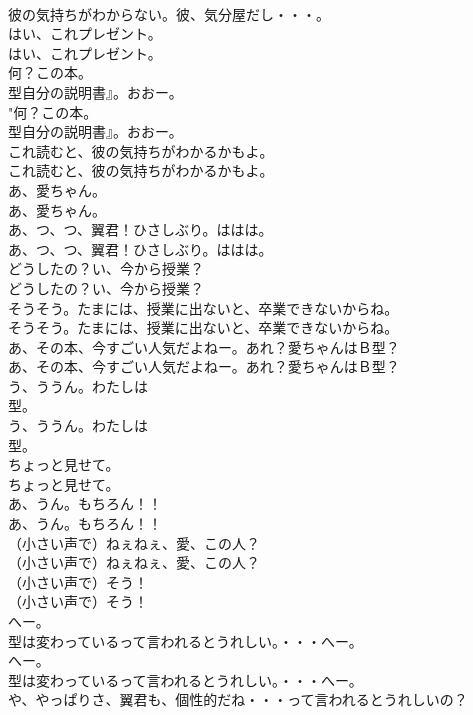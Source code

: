 \documentclass[8pt]{extreport}
\begin{document}
\begin{CJK}{UTF8}{min}
\\	彼の気持ちがわからない。彼、気分屋だし・・・。 
\\	はい、これプレゼント。	
\\	はい、これプレゼント。 
\\	何？この本。
\\	型自分の説明書』。おおー。	
\\	"何？この本。
\\	型自分の説明書』。おおー。 
\\	これ読むと、彼の気持ちがわかるかもよ。	
\\	これ読むと、彼の気持ちがわかるかもよ。 
\\	あ、愛ちゃん。	
\\	あ、愛ちゃん。 
\\	あ、つ、つ、翼君！ひさしぶり。ははは。	
\\	あ、つ、つ、翼君！ひさしぶり。ははは。 
\\	どうしたの？い、今から授業？	
\\	どうしたの？い、今から授業？ 
\\	そうそう。たまには、授業に出ないと、卒業できないからね。	
\\	そうそう。たまには、授業に出ないと、卒業できないからね。 
\\	あ、その本、今すごい人気だよねー。あれ？愛ちゃんはＢ型？	
\\	あ、その本、今すごい人気だよねー。あれ？愛ちゃんはＢ型？ 
\\	う、ううん。わたしは
\\	型。	
\\	う、ううん。わたしは
\\	型。 
\\	ちょっと見せて。	
\\	ちょっと見せて。 
\\	あ、うん。もちろん！！	
\\	あ、うん。もちろん！！ 
\\	（小さい声で）ねぇねぇ、愛、この人？	
\\	（小さい声で）ねぇねぇ、愛、この人？ 
\\	（小さい声で）そう！	
\\	（小さい声で）そう！ 
\\	へー。
\\	型は変わっているって言われるとうれしい。・・・へー。	
\\	へー。
\\	型は変わっているって言われるとうれしい。・・・へー。 
\\	や、やっぱりさ、翼君も、個性的だね・・・って言われるとうれしいの？	

\end{CJK}
\end{document}
